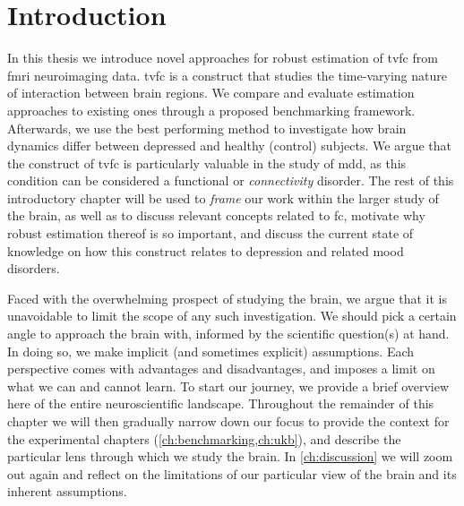 \chapter{Introduction}
\label{ch:introduction}

In this thesis we introduce novel approaches for robust estimation of \gls{tvfc} from \gls{fmri} neuroimaging data.
\Gls{tvfc} is a construct that studies the time-varying nature of interaction between brain regions.
We compare and evaluate estimation approaches to existing ones through a proposed benchmarking framework.
%
Afterwards, we use the best performing method to investigate how brain dynamics differ between depressed and healthy (control) subjects.
We argue that the construct of \gls{tvfc} is particularly valuable in the study of \gls{mdd}, as this condition can be considered a functional or \emph{connectivity} disorder.
%
The rest of this introductory chapter will be used to \emph{frame} our work within the larger study of the brain, as well as to discuss relevant concepts related to \gls{fc}, motivate why robust estimation thereof is so important, and discuss the current state of knowledge on how this construct relates to depression and related mood disorders.

Faced with the overwhelming prospect of studying the brain, we argue that it is unavoidable to limit the scope of any such investigation.
We should pick a certain angle to approach the brain with, informed by the scientific question(s) at hand.
In doing so, we make implicit (and sometimes explicit) assumptions.
Each perspective comes with advantages and disadvantages, and imposes a limit on what we can and cannot learn.
To start our journey, we provide a brief overview here of the entire neuroscientific landscape.
Throughout the remainder of this chapter we will then gradually narrow down our focus to provide the context for the experimental chapters (\cref{ch:benchmarking,ch:ukb}), and describe the particular lens through which we study the brain.
In \cref{ch:discussion} we will zoom out again and reflect on the limitations of our particular view of the brain and its inherent assumptions.

